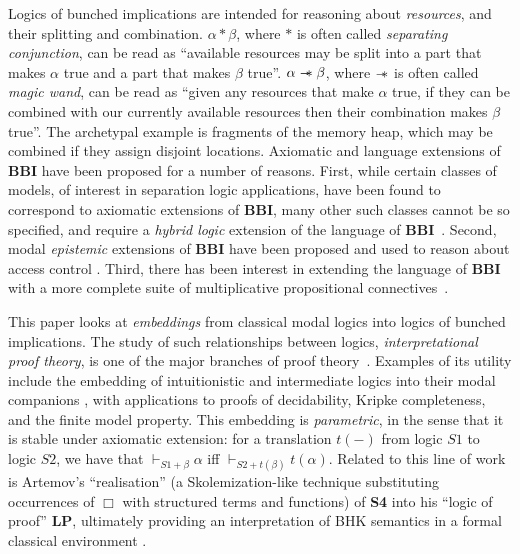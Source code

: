 \documentclass[a4paper]{article}
\newcommand\magicwand{\mathrel{-\mkern-6mu*}}
\newcommand{\BBI}{\textbf{BBI}\xspace}
\newcommand{\SFour}{\textbf{S4}\xspace}
\begin{document}
Logics of bunched implications are intended for reasoning about \textit{resources}, and their splitting and combination.
$\alpha * \beta$, where $*$ is often called \emph{separating conjunction}, can be read as ``available resources may be split into a part that makes $\alpha$ true and a part that makes $\beta$ true''.
$\alpha \magicwand \beta$, where $\magicwand$ is often called \emph{magic wand}, can be read as ``given any resources that make $\alpha$ true, if they can be combined with our currently available resources then their combination makes $\beta$ true''.
The archetypal example is fragments of the memory heap, which may be combined if they assign disjoint locations.
Axiomatic and language extensions of \BBI have been proposed for a number of reasons.
First, while certain classes of models, of interest in separation logic applications, have been found to correspond to axiomatic extensions of \BBI, many other such classes cannot be so specified, and require 
a \textit{hybrid logic} extension of the language of \BBI~\cite{separation_theories}.
Second, modal \textit{epistemic} extensions of \BBI have been proposed and used to reason about access control \cite{courtault:hal-01259768,10.1093/logcom/exz024}. 
Third, there has been interest in extending the language of \BBI with a more complete suite of multiplicative propositional connectives~\cite{Brotherston2010ClassicalBI,intermediateBBI}.

This paper looks at \emph{embeddings} from classical modal logics into logics of bunched implications.
The study of such relationships between logics, \emph{interpretational proof theory}, is one of the major branches of proof theory~\cite{Troelstra2000Basic}. Examples of its utility include the embedding of intuitionistic and intermediate logics into their modal companions \cite{chagrov_modal_1992}, with applications to proofs of decidability, Kripke completeness, and the finite model property. This embedding is \emph{parametric}, in the sense that it is stable under axiomatic extension: for a translation $t(-)$ from logic $S1$ to logic $S2$, we have that $\vdash_{S1+\beta}\alpha$ iff $\vdash_{S2+t(\beta)} t(\alpha)$.
Related to this line of work is Artemov's ``realisation'' (a Skolemization-like technique substituting occurrences of $\Box$ with structured terms and functions) of \SFour into his ``logic of proof'' \textbf{LP}, ultimately providing an interpretation of BHK semantics in a formal classical environment \cite{artemov2019justification}.
\end{document}
